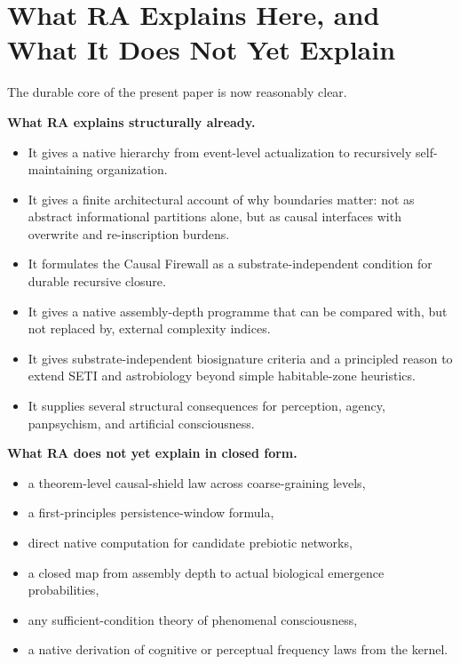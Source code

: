 \documentclass[11pt]{article}
\begin{document}
\section{What RA Explains Here, and What It Does Not Yet Explain}

The durable core of the present paper is now reasonably clear.

\textbf{What RA explains structurally already.}
\begin{itemize}[nosep]
    \item It gives a native hierarchy from event-level actualization to recursively self-maintaining organization.
    \item It gives a finite architectural account of why boundaries matter: not as abstract informational partitions alone, but as causal interfaces with overwrite and re-inscription burdens.
    \item It formulates the Causal Firewall as a substrate-independent condition for durable recursive closure.
    \item It gives a native assembly-depth programme that can be compared with, but not replaced by, external complexity indices.
    \item It gives substrate-independent biosignature criteria and a principled reason to extend SETI and astrobiology beyond simple habitable-zone heuristics.
    \item It supplies several structural consequences for perception, agency, panpsychism, and artificial consciousness.
\end{itemize}

\textbf{What RA does not yet explain in closed form.}
\begin{itemize}[nosep]
    \item a theorem-level causal-shield law across coarse-graining levels,
    \item a first-principles persistence-window formula,
    \item direct native computation for candidate prebiotic networks,
    \item a closed map from assembly depth to actual biological emergence probabilities,
    \item any sufficient-condition theory of phenomenal consciousness,
    \item a native derivation of cognitive or perceptual frequency laws from the kernel.
\end{itemize}
\end{document}
